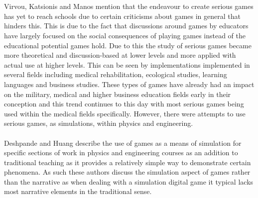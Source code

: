 \documentclass[conference]{IEEEtran}
\begin{document}
\\\\
Virvou, Katsionis and Manos\cite{Virvou2005} mention that the endeavour to create serious games has yet to reach schools due to certain criticisms about games in general that hinders this. This is due to the fact that discussions around games by educators have largely focused on the social consequences of playing games instead of the educational potential games hold\cite{Squire2003}. Due to this the study of serious games became more theoretical and discussion-based at lower levels and more applied with actual use at higher levels. This can be seen by implementations implemented in several fields including medical rehabilitation, ecological studies, learning languages and business studies\cite{Burke2009, Costanza2014, Ranalli2008, Tao2009}. These types of games have already had an impact on the military, medical and higher business education fields early in their conception and this trend continues to this day with most serious games being used within the medical fields specifically\cite{Annetta2008, DeGloria2014}. However, there were attempts to use serious games, as simulations, within physics and engineering\cite{Deshpande2011}.
\\\\
Deshpande and Huang\cite{Deshpande2011} describe the use of games as a means of simulation for specific sections of work in physics and engineering courses as an addition to traditional teaching as it provides a relatively simple way to demonstrate certain phenomena. As such these authors discuss the simulation aspect of games rather than the narrative as when dealing with a simulation digital game it typical lacks most narrative elements in the traditional sense\cite{Deshpande2011}.
\end{document}

